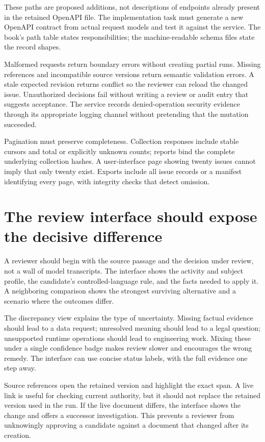 \documentclass[12pt,a4paper,oneside,openany]{book}
\begin{document}
These paths are proposed additions, not descriptions of endpoints already present
in the retained OpenAPI file. The implementation task must generate a new OpenAPI
contract from actual request models and test it against the service. The book's
path table states responsibilities; the machine-readable schema files state the
record shapes.

Malformed requests return boundary errors without creating partial runs. Missing
references and incompatible source versions return semantic validation errors.
A stale expected revision returns conflict so the reviewer can reload the changed
issue. Unauthorized decisions fail without writing a review or audit entry that
suggests acceptance. The service records denied-operation security evidence
through its appropriate logging channel without pretending that the mutation
succeeded.

Pagination must preserve completeness. Collection responses include stable cursors
and total or explicitly unknown counts; reports bind the complete underlying
collection hashes. A user-interface page showing twenty issues cannot imply that
only twenty exist. Exports include all issue records or a manifest identifying
every page, with integrity checks that detect omission.

\section{The review interface should expose the decisive difference}

A reviewer should begin with the source passage and the decision under review,
not a wall of model transcripts. The interface shows the activity and subject
profile, the candidate's controlled-language rule, and the facts needed to apply
it. A neighboring comparison shows the strongest surviving alternative and a
scenario where the outcomes differ.

The discrepancy view explains the type of uncertainty. Missing factual evidence
should lead to a data request; unresolved meaning should lead to a legal question;
unsupported runtime operations should lead to engineering work. Mixing these
under a single confidence badge makes review slower and encourages the wrong
remedy. The interface can use concise status labels, with the full evidence one
step away.

Source references open the retained version and highlight the exact span. A live
link is useful for checking current authority, but it should not replace the
retained version used in the run. If the live document differs, the interface
shows the change and offers a successor investigation. This prevents a reviewer
from unknowingly approving a candidate against a document that changed after
its creation.
\end{document}
